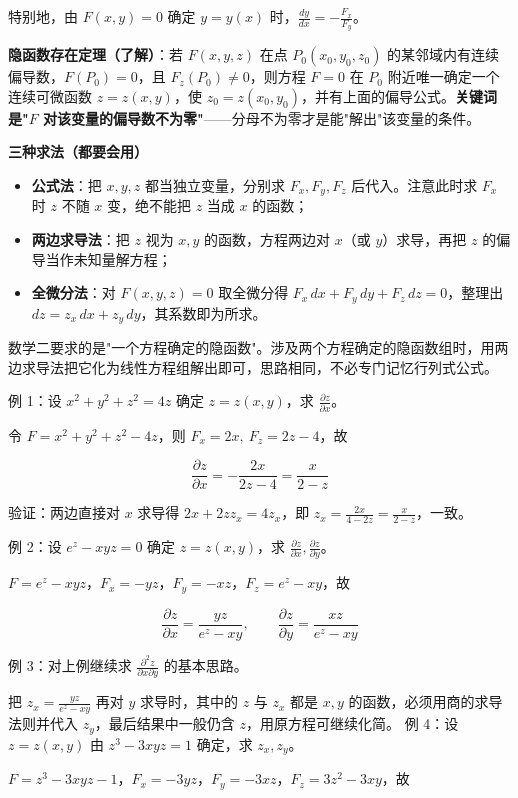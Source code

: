 \documentclass[11pt,openany,UTF8]{ctexbook}
\begin{document}
特别地，由 $F(x,y)=0$ 确定 $y=y(x)$ 时，$\frac{dy}{dx}=-\frac{F_x}{F_y}$。

\textbf{隐函数存在定理（了解）}：若 $F(x,y,z)$ 在点 $P_0(x_0,y_0,z_0)$ 的某邻域内有连续偏导数，$F(P_0)=0$，且 $F_z(P_0)\ne 0$，则方程 $F=0$ 在 $P_0$ 附近唯一确定一个连续可微函数 $z=z(x,y)$，使 $z_0=z(x_0,y_0)$，并有上面的偏导公式。\textbf{关键词是"$F$ 对该变量的偏导数不为零"}——分母不为零才是能"解出"该变量的条件。

\textbf{三种求法（都要会用）}

\begin{itemize}
\item \textbf{公式法}：把 $x,y,z$ 都当独立变量，分别求 $F_x,F_y,F_z$ 后代入。注意此时求 $F_x$ 时 $z$ 不随 $x$ 变，绝不能把 $z$ 当成 $x$ 的函数；
\item \textbf{两边求导法}：把 $z$ 视为 $x,y$ 的函数，方程两边对 $x$（或 $y$）求导，再把 $z$ 的偏导当作未知量解方程；
\item \textbf{全微分法}：对 $F(x,y,z)=0$ 取全微分得 $F_x\,dx+F_y\,dy+F_z\,dz=0$，整理出 $dz=z_x\,dx+z_y\,dy$，其系数即为所求。
\end{itemize}
数学二要求的是"一个方程确定的隐函数"。涉及两个方程确定的隐函数组时，用两边求导法把它化为线性方程组解出即可，思路相同，不必专门记忆行列式公式。

例 1：设 $x^{2}+y^{2}+z^{2}=4z$ 确定 $z=z(x,y)$，求 $\frac{\partial z}{\partial x}$。

令 $F=x^{2}+y^{2}+z^{2}-4z$，则 $F_x=2x,\ F_z=2z-4$，故

\[\frac{\partial z}{\partial x}=-\frac{2x}{2z-4}=\frac{x}{2-z}\]

验证：两边直接对 $x$ 求导得 $2x+2zz_x=4z_x$，即 $z_x=\frac{2x}{4-2z}=\frac{x}{2-z}$，一致。

例 2：设 $e^{z}-xyz=0$ 确定 $z=z(x,y)$，求 $\frac{\partial z}{\partial x},\frac{\partial z}{\partial y}$。

$F=e^{z}-xyz$，$F_x=-yz$，$F_y=-xz$，$F_z=e^{z}-xy$，故

\[\frac{\partial z}{\partial x}=\frac{yz}{e^{z}-xy},\qquad \frac{\partial z}{\partial y}=\frac{xz}{e^{z}-xy}\]

例 3：对上例继续求 $\frac{\partial^{2}z}{\partial x\partial y}$ 的基本思路。

把 $z_x=\frac{yz}{e^{z}-xy}$ 再对 $y$ 求导时，其中的 $z$ 与 $z_x$ 都是 $x,y$ 的函数，必须用商的求导法则并代入 $z_y$，最后结果中一般仍含 $z$，用原方程可继续化简。 例 4：设 $z=z(x,y)$ 由 $z^{3}-3xyz=1$ 确定，求 $z_x,z_y$。

$F=z^{3}-3xyz-1$，$F_x=-3yz$，$F_y=-3xz$，$F_z=3z^{2}-3xy$，故
\end{document}
